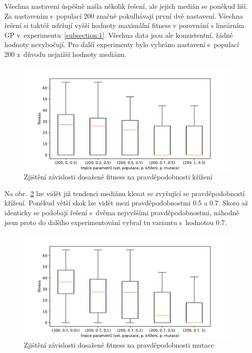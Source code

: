 Všechna nastavení úspěšně našla několik řešení, ale jejich medián se poněkud liší. Za nastavením s~populací 200 značně pokulhávají první dvě nastavení. Všechna řešení si taktéž udržují vyšší hodnoty maximální fitness v porovnání s lineárním GP v~experimentu~\ref{subsection:1}. Všechna data jsou ale konzistentní, žádné hodnoty nevybočují. Pro další experimenty bylo vybráno nastavení s~populací 200 z~důvodu nejnižší hodnoty mediánu.

\begin{figure}[!h]
    \centering
    \includegraphics[scale=0.65]{obrazky-figures/exp-tgp-santfe-searching-params-2.pdf}
    \caption{Zjištění závislosti dosažené fitness na pravděpodobnosti křížení}
    \label{fig:exp-tgp-santa-fe-2}
\end{figure} 

Na obr.~\ref{fig:exp-tgp-santa-fe-3} lze vidět již tendenci mediánu klesat se zvyšující se pravděpodobností křížení. Poněkud větší skok lze vidět mezi pravděpodobnostmi 0.5 a 0.7. Skoro až identicky se podobají řešení s~dvěma nejvyššími pravděpodobnostmi, náhodně jsem proto do dalšího experimentování vybral tu variantu s~hodnotou 0.7.

\newpage
\begin{figure}[!h]
    \centering
    \includegraphics[scale=0.65]{obrazky-figures/exp-tgp-santfe-searching-params-3.pdf}
    \caption{Zjištění závislosti dosažené fitness na pravděpodobnosti mutace}
    \label{fig:exp-tgp-santa-fe-3}
\end{figure}    

